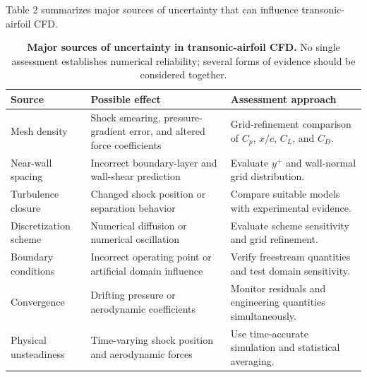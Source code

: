 \documentclass[10pt]{article}
\begin{document}

Table 2 summarizes major sources of uncertainty that can influence
transonic-airfoil CFD.

\begin{table}[H]

\caption{\textbf{Major sources of uncertainty in transonic-airfoil
CFD.} No single assessment establishes numerical reliability; several
forms of evidence should be considered together.}

\centering
\fontsize{9}{10}\selectfont

\begin{tabularx}{\textwidth}{
    L{2.6cm}
    Y
    Y
}

\toprule

\textbf{Source} &
\textbf{Possible effect} &
\textbf{Assessment approach} \\

\midrule

Mesh density &
Shock smearing, pressure-gradient error, and altered force coefficients &
Grid-refinement comparison of $C_p$, $x/c$, $C_L$, and $C_D$. \\

\addlinespace

Near-wall spacing &
Incorrect boundary-layer and wall-shear prediction &
Evaluate $y^+$ and wall-normal grid distribution. \\

\addlinespace

Turbulence closure &
Changed shock position or separation behavior &
Compare suitable models with experimental evidence. \\

\addlinespace

Discretization scheme &
Numerical diffusion or numerical oscillation &
Evaluate scheme sensitivity and grid refinement. \\

\addlinespace

Boundary conditions &
Incorrect operating point or artificial domain influence &
Verify freestream quantities and test domain sensitivity. \\

\addlinespace

Convergence &
Drifting pressure or aerodynamic coefficients &
Monitor residuals and engineering quantities simultaneously. \\

\addlinespace

Physical unsteadiness &
Time-varying shock position and aerodynamic forces &
Use time-accurate simulation and statistical averaging. \\

\bottomrule

\end{tabularx}

\end{table}
\end{document}
